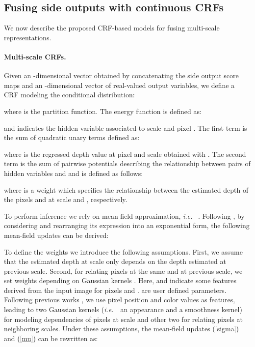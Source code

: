 \documentclass[10pt,twocolumn,letterpaper]{article}
\def\ie{\textit{i.e.}~}
\begin{document}
\subsection{Fusing side outputs with continuous CRFs}
We now describe the proposed CRF-based models for fusing multi-scale representations. \vspace{-3mm}
\paragraph{Multi-scale CRFs.} 
\label{sec:HCRF}
Given an -dimensional vector  obtained by concatenating the side output 
{score maps}  and 
an -dimensional vector  of real-valued output variables, 
we define a CRF modeling the conditional distribution:

where  is the partition function.
The energy function is defined as:

and  indicates the hidden variable associated to scale  and pixel .
The first term is the sum of quadratic unary terms defined as:

where  is the regressed depth value at pixel  and scale  obtained with .
The second term is the sum of pairwise potentials describing the relationship 
between pairs of hidden variables  and  and is defined as follows:

where  is a weight which specifies the relationship between the estimated depth
of the pixels  and  at scale  and , respectively.

To perform inference we rely on mean-field approximation, \ie 
. 
Following \cite{ristovski2013continuous}, by considering
 and rearranging its expression into an exponential form, the following
mean-field updates can be derived:


To define the weights  we introduce the following assumptions. First, we assume that the estimated depth at scale  only
depends on the depth estimated at previous scale. Second, for relating pixels at the same and at previous scale, we set
weights depending on  Gaussian kernels . Here,
 and  indicate some features derived from the input image  for pixels  and .  are user defined parameters. 
Following previous works \cite{koltun2011efficient}, we use pixel position 
and color values as features, leading to two Gaussian kernels (\ie~an appearance and a smoothness kernel)
for modeling dependencies of pixels at scale  and other two for relating pixels at neighboring scales. 
Under these assumptions, the mean-field updates (\ref{sigma}) and (\ref{mu}) can be rewritten as:
\end{document}
